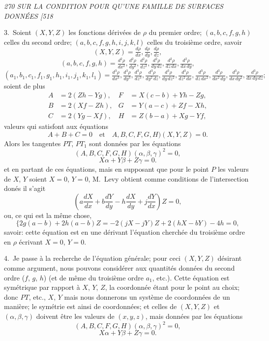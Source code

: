 \documentclass[11pt,a4paper]{book}
\begin{document}
\noindent\textit{270 \hfill SUR LA CONDITION POUR QU'UNE FAMILLE DE SURFACES DONN\'EES \hfill [518}

\medskip

3.~Soient $(X, Y, Z)$ les fonctions d\'eriv\'ees de $\rho$ du premier ordre; $(a, b, c, f, g, h)$
celles du second ordre; $(a, b, c, f, g, h, i, j, k, l)$ celles du troisi\`eme ordre, savoir
\[
(X, Y, Z) = \tfrac{d\rho}{dx}, \tfrac{d\rho}{dy}, \tfrac{d\rho}{dz},
\]
\[
(a, b, c, f, g, h) = \tfrac{d^2\rho}{dx^2}, \tfrac{d^2\rho}{dy^2}, \tfrac{d^2\rho}{dz^2}, \tfrac{d^2\rho}{dy\,dz}, \tfrac{d^2\rho}{dz\,dx}, \tfrac{d^2\rho}{dx\,dy},
\]
\[
(a_1, b_1, c_1, f_1, g_1, h_1, i_1, j_1, k_1, l_1) = \tfrac{d^3\rho}{dx^3}, \tfrac{d^3\rho}{dy^3}, \tfrac{d^3\rho}{dz^3}, \tfrac{d^3\rho}{dy^2\,dz}, \tfrac{d^3\rho}{dy\,dz^2}, \tfrac{d^3\rho}{dz^2\,dx}, \tfrac{d^3\rho}{dz\,dx^2}, \tfrac{d^3\rho}{dx^2\,dy}, \tfrac{d^3\rho}{dx\,dy^2}, \tfrac{d^3\rho}{dx\,dy\,dz};
\]
soient de plus
\begin{align*}
A &= 2(Zh - Yg), & F &= X(c - b) + Yh - Zg, \\
B &= 2(Xf - Zh), & G &= Y(a - c) + Zf - Xh, \\
C &= 2(Yg - Xf), & H &= Z(b - a) + Xg - Yf,
\end{align*}
valeurs qui satisfont aux \'equations
\[
A + B + C = 0 \quad \text{et} \quad A, B, C, F, G, H)(X, Y, Z) = 0.
\]
Alors les tangentes $PT$, $PT_1$ sont donn\'ees par les \'equations
\[
(A, B, C, F, G, H)(\alpha, \beta, \gamma)^2 = 0,
\]
\[
X\alpha + Y\beta + Z\gamma = 0.
\]
et en partant de ces \'equations, mais en supposant que pour le point $P$ les valeurs
de $X$, $Y$ soient $X = 0$, $Y = 0$, M.~Levy obtient comme conditions de l'intersection don\'es
il s'agit
\[
\left(a\frac{dX}{dx} + b\frac{dY}{dy} - h\frac{dX}{dy} + j\frac{dY}{dx}\right)Z = 0,
\]
ou, ce qui est la m\^eme chose,
\[
\{2g(a - b) + 2h(a - b)Z = -2(jX - jY)Z + 2(hX - bY) - 4h = 0,
\]
savoir: cette \'equation est en une d\'erivant l'\'equation cherch\'ee du troisi\`eme ordre en $\rho$
\'ecrivant $X = 0$, $Y = 0$.

\medskip

4.~Je passe \`a la recherche de l'\'equation g\'en\'erale; pour ceci $(X, Y, Z)$ d\'esirant
comme argument, nous pouvons consid\'erer aux quantit\'es donn\'ees du second ordre
($f$, $g$, $h$) (et de m\^eme du troisi\`eme ordre $a_1$, etc.). Cette \'equation est sym\'etrique par
rapport \`a $X$, $Y$, $Z$, la coordonn\'ee \'etant pour le point au choix; donc $PT$, etc., $X$, $Y$
mais nous donnerons un syst\`eme de coordonn\'ees de un mani\`ere; le sym\'etrie est ainsi
de coordonn\'ees; et celles de $(X, Y, Z)$ et $(\alpha, \beta, \gamma)$ doivent \^etre les valeurs de $(x, y, z)$,
mais donn\'ees par les \'equations
\[
(A, B, C, F, G, H)(\alpha, \beta, \gamma)^2 = 0,
\]
\[
X\alpha + Y\beta + Z\gamma = 0.
\]
\end{document}
